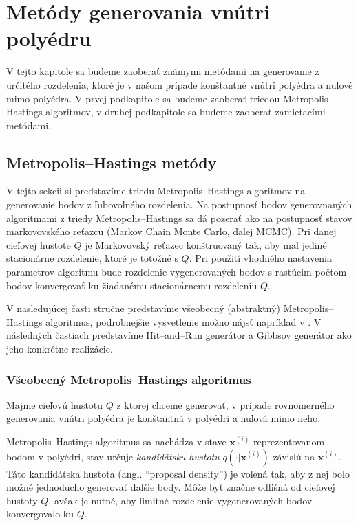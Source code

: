 \chapter{Metódy generovania vnútri polyédru}

V tejto kapitole sa budeme zaoberať známymi metódami na generovanie z určitého rozdelenia, ktoré je v našom prípade konštantné vnútri polyédra a nulové mimo polyédra. V prvej podkapitole sa budeme zaoberať triedou Metropolis--Hastings algoritmov, v druhej podkapitole sa budeme zaoberať zamietacími metódami.

\section{Metropolis--Hastings metódy}

V tejto sekcii si predstavíme triedu Metropolis--Hastings algoritmov na generovanie bodov z ľubovoľného rozdelenia. Na postupnosť bodov generovnaných algoritmami z triedy Metropolis--Hastings sa dá pozerať ako na postupnosť stavov markovovského reťazcu (Markov Chain Monte Carlo, ďalej MCMC). Pri danej cieľovej hustote $Q$ je Markovovský reťazec konštruovaný tak, aby mal jediné stacionárne rozdelenie, ktoré je totožné s $Q$. Pri použití vhodného nastavenia parametrov algoritmu bude rozdelenie vygenerovaných bodov s rastúcim počtom bodov konvergovať ku žiadanému stacionárnemu rozdeleniu $Q$.

V nasledujúcej časti stručne predstavíme všeobecný (abstraktný) Metropolis--Hastings algoritmus, podrobnejšie vysvetlenie možno nájsť napríklad v \cite{metropolis-hastings_chib}. V následných častiach predstavíme Hit--and--Run generátor a Gibbsov generátor ako jeho konkrétne realizácie.

\subsection{Všeobecný Metropolis--Hastings algoritmus}

Majme cieľovú hustotu $Q$ z ktorej chceme generovať, v prípade rovnomerného generovania vnútri polyédra je konštantná v polyédri a nulová mimo neho.

Metropolis--Hastings algoritmus \cite{metropolis-hastings_chib} sa nachádza v stave $\mathbf x^{(i)}$ reprezentovanom bodom v polyédri, stav určuje \textit{kandidátsku hustotu} $q(\cdot | \mathbf x^{(i)})$ závislú na $\mathbf x^{(i)}$. Táto kandidátska hustota (angl. ``proposal density'') je volená tak, aby z nej bolo možné jednoducho generovať ďalšie body. Môže byť značne odlišná od cieľovej hustoty $Q$, avšak je nutné, aby limitné rozdelenie vygenerovaných bodov konvergovalo ku $Q$.


